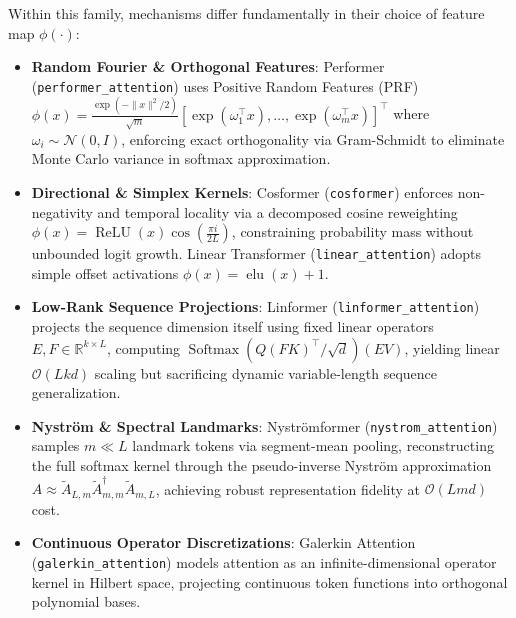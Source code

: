 \documentclass{article}
\begin{document}
Within this family, mechanisms differ fundamentally in their choice of feature map $\phi(\cdot)$:
\begin{itemize}
    \item \textbf{Random Fourier \& Orthogonal Features}: Performer (\texttt{performer\_attention}) \citep{choromanski2021rethinking} uses Positive Random Features (PRF) $\phi(x) = \frac{\exp(-\|x\|^2 / 2)}{\sqrt{m}} [\exp(\omega_1^\top x), \dots, \exp(\omega_m^\top x)]^\top$ where $\omega_i \sim \mathcal{N}(0, I)$, enforcing exact orthogonality via Gram-Schmidt to eliminate Monte Carlo variance in softmax approximation.
    \item \textbf{Directional \& Simplex Kernels}: Cosformer (\texttt{cosformer}) \citep{qin2022cosformer} enforces non-negativity and temporal locality via a decomposed cosine reweighting $\phi(x) = \operatorname{ReLU}(x) \cos\left(\frac{\pi i}{2 L}\right)$, constraining probability mass without unbounded logit growth. Linear Transformer (\texttt{linear\_attention}) \citep{katharopoulos2020transformers} adopts simple offset activations $\phi(x) = \operatorname{elu}(x) + 1$.
    \item \textbf{Low-Rank Sequence Projections}: Linformer (\texttt{linformer\_attention}) \citep{wang2020linformer} projects the sequence dimension itself using fixed linear operators $E, F \in \mathbb{R}^{k \times L}$, computing $\operatorname{Softmax}(Q (F K)^\top / \sqrt{d}) (E V)$, yielding linear $\mathcal{O}(L k d)$ scaling but sacrificing dynamic variable-length sequence generalization.
    \item \textbf{Nystr{\"o}m \& Spectral Landmarks}: Nystr{\"o}mformer (\texttt{nystrom\_attention}) \citep{xiong2021nystromformer} samples $m \ll L$ landmark tokens via segment-mean pooling, reconstructing the full softmax kernel through the pseudo-inverse Nystr{\"o}m approximation $A \approx \tilde{A}_{L, m} \tilde{A}_{m, m}^\dagger \tilde{A}_{m, L}$, achieving robust representation fidelity at $\mathcal{O}(L m d)$ cost.
    \item \textbf{Continuous Operator Discretizations}: Galerkin Attention (\texttt{galerkin\_attention}) models attention as an infinite-dimensional operator kernel in Hilbert space, projecting continuous token functions into orthogonal polynomial bases.
\end{itemize}
\end{document}

